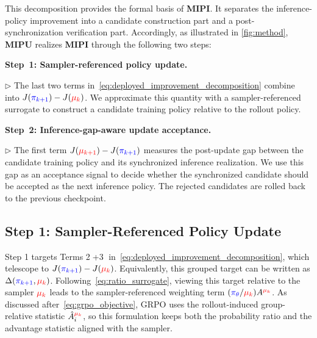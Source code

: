 This decomposition provides the formal basis of \textbf{MIPI}.
It separates the inference-policy improvement into a candidate construction part and a post-synchronization verification part.
Accordingly, as illustrated in \autoref{fig:method}, \textbf{MIPU} realizes \textbf{MIPI} through the following two steps:

\begin{tcolorbox}[
colback=Cornsilk,
colframe=lightgray,
title=\textbf{MIPU: Two-Step Realization of MIPI}
]
\textbf{Step~1: Sampler-referenced policy update.}
\vspace{0.1cm}

    $\triangleright$ The last two terms in~\autoref{eq:deployed_improvement_decomposition} combine into
    $J(\textcolor{blue}{\pi_{k+1}})-J(\textcolor{red}{\mu_k})$.
    We approximate this quantity with a sampler-referenced surrogate to construct a candidate training policy relative to the rollout policy.

\vspace{0.2cm}
\textbf{Step~2: Inference-gap-aware update acceptance.}
\vspace{0.1cm}

    $\triangleright$ The first term
    $J(\textcolor{red}{\mu_{k+1}})-J(\textcolor{blue}{\pi_{k+1}})$
    measures the post-update gap between the candidate training policy and its synchronized inference realization.
    We use this gap as an acceptance signal to decide whether the synchronized candidate should be accepted as the next inference policy. The rejected candidates are rolled back to the previous checkpoint.
\end{tcolorbox}


\subsection{Step 1: Sampler-Referenced Policy Update}
\label{sec:step1_sampler_referenced_update}


Step 1 targets Terms \textcircled{2}+\textcircled{3} in~\autoref{eq:deployed_improvement_decomposition}, which telescope to $J(\textcolor{blue}{\pi_{k+1}})-J(\textcolor{red}{\mu_k})$.
Equivalently, this grouped target can be written as 
$\Delta(\textcolor{blue}{\pi_{k+1}},\textcolor{red}{\mu_k})$.
Following~\autoref{eq:ratio_surrogate}, viewing this target relative to the sampler \(\textcolor{red}{\mu_k}\) leads to the sampler-referenced weighting term \((\textcolor{blue}{\pi_\theta}/\textcolor{red}{\mu_k})A^{\textcolor{red}{\mu_k}}\). As discussed after~\autoref{eq:grpo_objective}, GRPO uses the rollout-induced group-relative statistic \(\hat{A}^{\textcolor{red}{\mu_k}}_i\), so this formulation keeps both the probability ratio and the advantage statistic aligned with the sampler.

